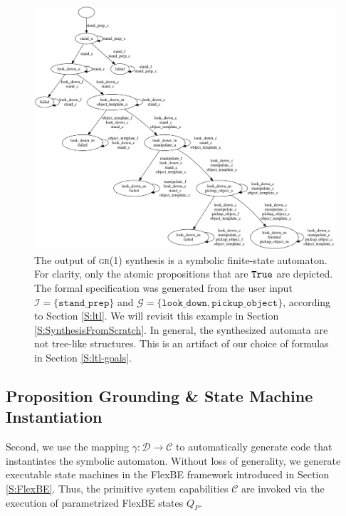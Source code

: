 \begin{figure}[t]
\centering
\includegraphics[width=0.95\columnwidth,clip]{./img/synthesized_automaton.png}
\caption{
	The output of \textsc{gr(1)} synthesis is a symbolic finite-state automaton.
	For clarity, only the atomic propositions that are $\mathtt{True}$ are depicted.
	The formal specification was generated from the user input $\mathcal{I} = \{ \mathtt{stand\_prep} \}$ and $\mathcal{G} = \{ \mathtt{look\_down, pickup\_object} \}$, according to Section \ref{S:ltl}.
	We will revisit this example in Section \ref{S:SynthesisFromScratch}.
	In general, the synthesized automata are not tree-like structures.
	This is an artifact of our choice of formulas in Section \ref{S:ltl-goals}.
}
\label{Fig:SynthesizedAutomaton}
\end{figure}

\subsection{Proposition Grounding \& State Machine Instantiation}

Second, we use the mapping $\gamma: \mathcal{D} \rightarrow \mathcal{C}$ to automatically generate code that instantiates the symbolic automaton.
Without loss of generality, we generate executable state machines in the FlexBE framework introduced in Section \ref{S:FlexBE}.
Thus, the primitive system capabilities $\mathcal{C}$ are invoked via the execution of parametrized FlexBE states $Q_P$.

